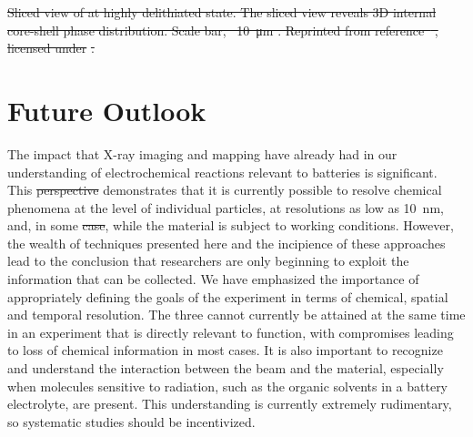 \documentclass[journal=cmatex,manuscript=perspective]{achemso}
\providecommand{\DIFaddtex}[1]{{\protect\color{blue}\uwave{#1}}} %
\providecommand{\DIFdeltex}[1]{{\protect\color{red}\sout{#1}}}                      %
\providecommand{\DIFaddbegin}{} %
\providecommand{\DIFaddend}{} %
\providecommand{\DIFdelbegin}{} %
\providecommand{\DIFdelend}{} %
\providecommand{\DIFdelFL}[1]{\DIFdel{#1}} %
\providecommand{\DIFadd}[1]{\texorpdfstring{\DIFaddtex{#1}}{#1}} %
\providecommand{\DIFdel}[1]{\texorpdfstring{\DIFdeltex{#1}}{}} %
\begin{document}
{%
\DIFdelFL{Sliced view of  at highly delithiated
    state. The sliced view reveals 3D internal core-shell phase
    distribution. Scale bar, \mbox{%
\SI{10}{\micro\metre}}%
. Reprinted from
    reference\mbox{%
\cite{wang2016}}%
, licensed under
    }%
\DIFdelFL{.}}

\DIFdelend \section{Future Outlook}

The impact that X-ray imaging and mapping have already had in our
understanding of electrochemical reactions relevant to batteries is
significant. This \DIFdelbegin \DIFdel{perspective }\DIFdelend \DIFaddbegin \DIFadd{Perspective }\DIFaddend demonstrates that it is currently
possible to resolve chemical phenomena at the level of individual
particles, at resolutions as low as \SI{10}{nm}, and, in some \DIFdelbegin \DIFdel{case}\DIFdelend \DIFaddbegin \DIFadd{cases}\DIFaddend ,
while the material is subject to working conditions. However, the
wealth of techniques presented here and the incipience of these
approaches lead to the conclusion that researchers are only beginning
to exploit the information that can be collected. We have emphasized
the importance of appropriately defining the goals of the experiment
in terms of chemical, spatial and temporal resolution. The three
cannot currently be attained at the same time in an experiment that is
directly relevant to function, with compromises leading to loss of
chemical information in most cases. It is also important to recognize
and understand the interaction between the beam and the material,
especially when molecules sensitive to radiation, such as the organic
solvents in a battery electrolyte, are present. This understanding is
currently extremely rudimentary, so systematic studies should be
incentivized.
\end{document}
